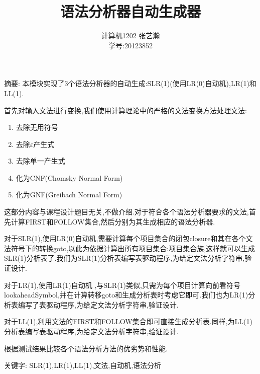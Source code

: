 \documentclass[11pt]{article}
\begin{document}

\title{语法分析器自动生成器}
\author{计算机1202 张艺瀚\\学号:20123852}
\maketitle

\renewcommand{\abstractname}{摘要}
\begin{onecolabstract}
\noindent{}摘要:
本模块实现了3个语法分析器的自动生成:SLR(1)(使用LR(0)自动机),LR(1)和LL(1).

首先对输入文法进行变换,我们使用计算理论中的严格的文法变换方法处理文法:
\begin{enumerate}
\item 去除无用符号
\item 去除$\varepsilon$产生式
\item 去除单一产生式
\item 化为CNF(Chomsky Normal Form)
\item 化为GNF(Greibach Normal Form)
\end{enumerate}

这部分内容与课程设计题目无关,不做介绍.对于符合各个语法分析器要求的文法,首先计算FIRST和FOLLOW集合,然后分别为其生成相应的语法分析器.

对于SLR(1),使用LR(0)自动机,需要计算每个项目集合的闭包closure和其在各个文法符号下的转换goto,以此为依据计算出所有项目集合:项目集合族,这样就可以生成SLR(1)分析表了.我们为SLR(1)分析表编写表驱动程序,为给定文法分析字符串,验证设计.

对于LR(1),使用LR(1)自动机 ,与SLR(1)类似,只需为每个项目计算向前看符号lookaheadSymbol,并在计算转移goto和生成分析表时考虑它即可.我们也为LR(1)分析表编写了表驱动程序,为给定文法分析字符串,验证设计.

对于LL(1),利用文法的FIRST和FOLLOW集合即可直接生成分析表.同样,为LL(1)分析表编写表驱动程序,为给定文法分析字符串,验证设计.

根据测试结果比较各个语法分析方法的优劣势和性能.

\par   %
\noindent{}关键字:
SLR(1),LR(1),LL(1),文法,自动机,语法分析
\end{onecolabstract}
\end{document}
